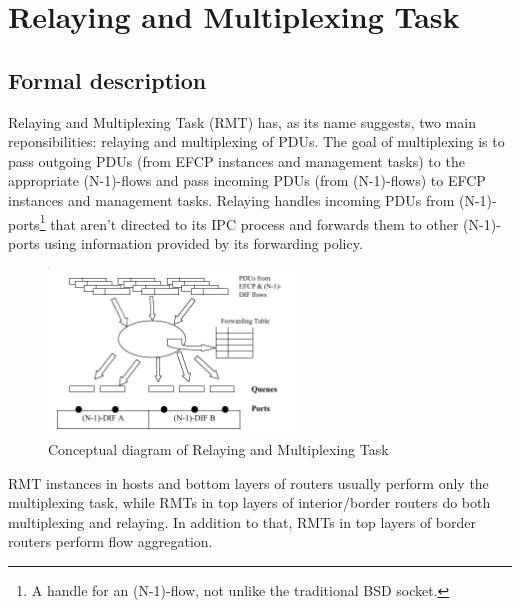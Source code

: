     \section{Relaying and Multiplexing Task}

        \subsection{Formal description}

            Relaying and Multiplexing Task (RMT) has, as its name suggests, two main reponsibilities: relaying and multiplexing of PDUs. The goal of multiplexing is to pass outgoing PDUs (from EFCP instances and management tasks) to the appropriate (N-1)-flows and pass incoming PDUs (from (N-1)-flows) to EFCP instances and management tasks. Relaying handles incoming PDUs from (N-1)-ports\footnote{A handle for an (N-1)-flow, not unlike the traditional BSD socket.} that aren't directed to its IPC process and forwards them to other (N-1)-ports using information provided by its forwarding policy.

            \begin{figure}[H]
                \begin{center}
                    \includegraphics[width=0.6\textwidth]{fig/fwding_rmt-module.png}
                  \caption{Conceptual diagram of Relaying and Multiplexing Task}
                  \label{fig:rmt1}
                \end{center}
            \end{figure}

            RMT instances in hosts and bottom layers of routers usually perform only the multiplexing task, while RMTs in top layers of interior/border routers do both multiplexing and relaying. In addition to that, RMTs in top layers of border routers perform flow aggregation.

